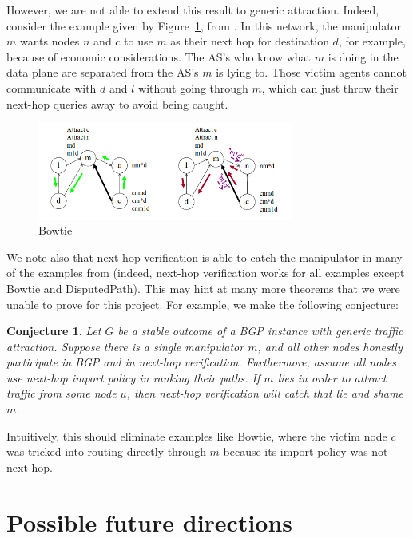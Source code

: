 \documentclass[10pt]{article}
\newtheorem{conjecture}{Conjecture}
\begin{document}
  However, we are not able to extend this result to generic attraction.
  Indeed, consider the example given by Figure~\ref{fig:Bowtie},
  from \cite{Attraction}.
  In this network, the manipulator $m$ wants nodes $n$ and $c$
  to use $m$ as their next hop for destination $d$,
  for example, because of economic considerations.
  The AS's who know what $m$ is doing in the data plane
  are separated from the AS's $m$ is lying to.
  Those victim agents cannot communicate with $d$ and $l$ without
  going through $m$, which can just throw their next-hop queries away
  to avoid being caught.
  \begin{figure}[h]
    \centering
    \caption{Bowtie}\label{fig:Bowtie}
    \includegraphics[width=0.75\textwidth]{Bowtie}
  \end{figure}

  We note also that next-hop verification is able to catch the manipulator in
  many of the examples from \cite{Attraction} (indeed, next-hop verification
  works for all examples except Bowtie and DisputedPath).
  This may hint at many more theorems that we were unable to prove for this
  project. For example, we make the following conjecture:
  \begin{conjecture}
    Let $G$ be a stable outcome of a BGP instance with generic traffic attraction.
    Suppose there is a single manipulator $m$,
    and all other nodes honestly participate in BGP and in next-hop verification.
    Furthermore, assume all nodes use next-hop import policy in ranking their paths.
    If $m$ lies in order to attract traffic from some node $u$,
    then next-hop verification will catch that lie and shame $m$.
  \end{conjecture}
  Intuitively, this should eliminate examples like Bowtie, where the victim node
  $c$ was tricked into routing directly through $m$ because its import policy was not
  next-hop.


\section{Possible future directions}
\end{document}
